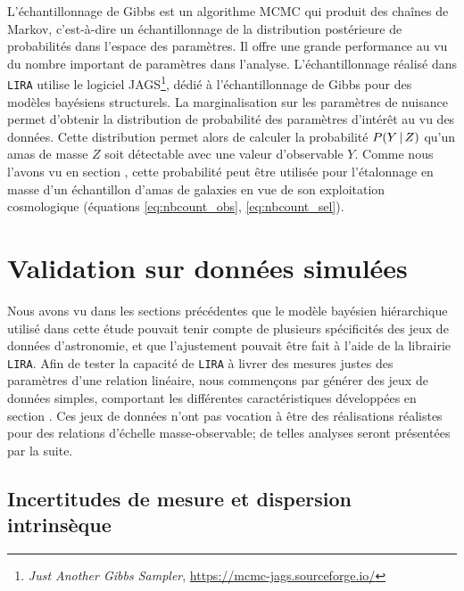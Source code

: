 L'échantillonnage de Gibbs est un algorithme MCMC qui produit des chaînes de Markov, c'est-à-dire un échantillonnage de la distribution postérieure de probabilités dans l'espace des paramètres.
Il offre une grande performance au vu du nombre important de paramètres dans l'analyse.
L'échantillonnage réalisé dans \texttt{LIRA} utilise le logiciel JAGS\footnote{\textit{Just Another Gibbs Sampler}, \url{https://mcmc-jags.sourceforge.io/}}, dédié à l'échantillonnage de Gibbs pour des modèles bayésiens structurels.
La marginalisation sur les paramètres de nuisance permet d'obtenir la distribution de probabilité des paramètres d'intérêt au vu des données.
Cette distribution permet alors de calculer la probabilité $P({Y\,|\,Z})$ qu'un amas de masse $Z$ soit détectable avec une valeur d'observable $Y$.
Comme nous l'avons vu en section , cette probabilité peut être utilisée pour l'étalonnage en masse d'un échantillon d'amas de galaxies en vue de son exploitation cosmologique (équations \ref{eq:nbcount_obs}, \ref{eq:nbcount_sel}).

\section{Validation sur données simulées}
\label{sec:scaling:valid}

Nous avons vu dans les sections précédentes que le modèle bayésien hiérarchique utilisé dans cette étude pouvait tenir compte de plusieurs spécificités des jeux de données d'astronomie, et que l'ajustement pouvait être fait à l'aide de la librairie \texttt{LIRA}.
Afin de tester la capacité de \texttt{LIRA} à livrer des mesures justes des paramètres d'une relation linéaire, nous commençons par générer des jeux de données simples, comportant les différentes caractéristiques développées en section .
Ces jeux de données n'ont pas vocation à être des réalisations réalistes pour des relations d'échelle masse-observable; de telles analyses seront présentées par la suite.

\subsection{Incertitudes de mesure et dispersion intrinsèque}
\label{sec:scaling:valid1}

